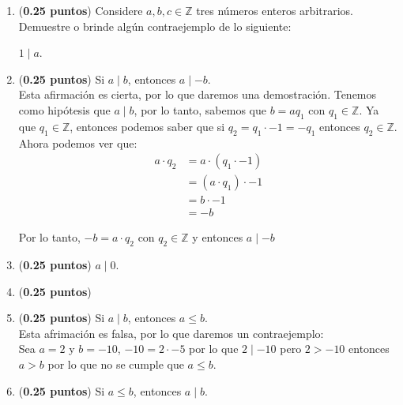 \documentclass[fontsize=12pt]{scrartcl}
\begin{document}
	\begin{enumerate}
		\item ({\bf 0.25 puntos}) 		
		Considere $a, b, c \in \mathbb{Z}$ tres n\'umeros enteros arbitrarios.
		Demuestre o brinde alg\'un contraejemplo de lo siguiente:
		
		$1 \mid a$.

		\item ({\bf 0.25 puntos})
		  Si $a \mid b$, entonces $a \mid -b$. \\
                  Esta afirmación es cierta, por lo que daremos una demostración.
		Tenemos como hipótesis que $a \mid b$, por lo tanto, sabemos que $b = a q_1$ con $q_1 \in \mathbb{Z} $.
                Ya que $q_1 \in \mathbb{Z}$, entonces podemos saber que si  $q_2 = q_1 \cdot -1 = -q_1 $ entonces $q_2\in \mathbb{Z}$.\\
                Ahora podemos ver que: \\
                \begin{equation*}
                  \begin{split}
                    a \cdot q_2 &= a \cdot (q_1 \cdot -1) \\
                    &= (a \cdot q_1) \cdot -1 \\
                    &= b \cdot -1 \\
                    &= -b 
                  \end{split}
                \end{equation*}
                
                Por lo tanto, $-b = a \cdot q_2$ con $q_2 \in \mathbb{Z}$ y entonces $a \mid -b$
		\item ({\bf 0.25 puntos})
		$a \mid 0$.

		\item ({\bf 0.25 puntos})
	
		\item ({\bf 0.25 puntos})
		  Si $a \mid b$, entonces $a \leq b$. \\
                  Esta afrimación es falsa, por lo que daremos un contraejemplo: \\
                  Sea $a = 2$ y $b= -10$, $-10 = 2 \cdot -5$ por lo que
                  $2 \mid -10$ pero $2 > -10$ entonces $a > b$ por lo que no se cumple que  $a \leq b$.
		
		\item ({\bf 0.25 puntos})
		Si $a \leq b$, entonces $a\mid b$.
		

\end{enumerate}
\end{document}
